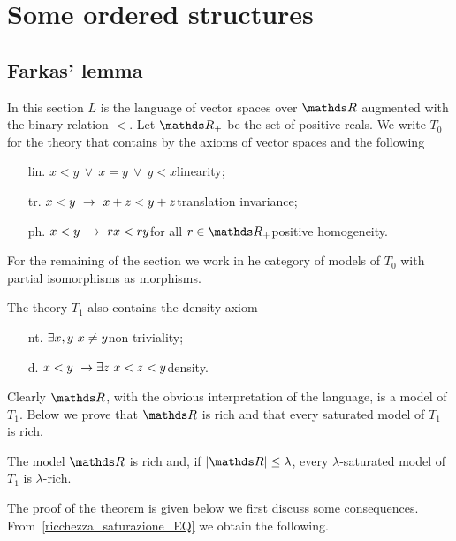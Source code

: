 \documentclass[creche.tex]{subfiles}
\begin{document}
\chapter{Some ordered structures}
\label{saturation}
 
\def\medrel#1{\parbox[t]{6ex}{$\displaystyle\hfil #1$}}
\def\ceq#1#2#3{\parbox{25ex}{$\displaystyle #1$}\medrel{#2}$\displaystyle  #3$}

\section{Farkas' lemma}
In this section $L$ is the language of vector spaces over $\RR$ augmented with the binary relation $<$. Let \emph{$\RR_+$\/} be the set of positive reals. We write \emph{$T_0$\/} for the theory that contains by the axioms of vector spaces and the following

\begin{itemize}
\item[lin.] $x<y\ \vee\ x=y\ \vee\  y<x$\hfill linearity;
\item[tr.] $x<y\ \rightarrow\ x+z < y+z$\hfill translation invariance;
\item[ph.] $x<y\ \rightarrow\ r x < r y$\quad for all $r\in\RR_+$\hfill positive homogeneity.
\end{itemize}
For the remaining of the section we work in he category of models of $T_0$ with partial isomorphisms as morphisms. 

The theory \emph{$T_1$\/} also contains the density axiom 

\begin{itemize}
\item[nt.]$\exists x,y\ x\neq y$\hfill non triviality;
\item[d.] $x<y\ \imp \E z\ x<z<y$\hfill density.
\end{itemize}

Clearly $\RR$, with the obvious interpretation of the language, is a model of $T_1$. Below we prove that $\RR$ is rich and that every saturated model of $T_1$ is rich.

\begin{theorem}
The model $\RR$ is rich and, if $|\RR|\le\lambda$, every $\lambda$-saturated model of $T_1$ is $\lambda$-rich.
\end{theorem}



The proof of the theorem is given below we first discuss some consequences. From~\ref{ricchezza_saturazione_EQ} we obtain the following.
\end{document}
